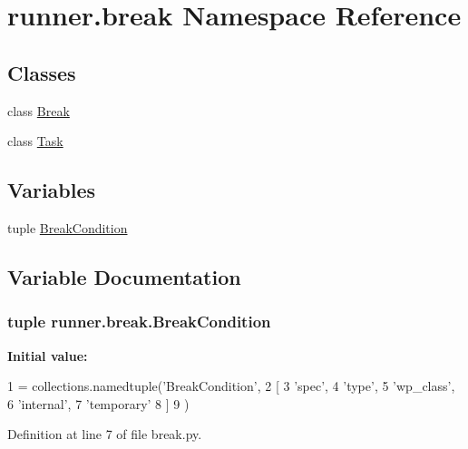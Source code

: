 \hypertarget{namespacerunner_1_1break}{}\section{runner.\+break Namespace Reference}
\label{namespacerunner_1_1break}
\subsection*{Classes}
\begin{DoxyCompactItemize}
\item 
class \hyperlink{classrunner_1_1break_1_1Break}{Break}
\item 
class \hyperlink{classrunner_1_1break_1_1Task}{Task}
\end{DoxyCompactItemize}
\subsection*{Variables}
\begin{DoxyCompactItemize}
\item 
tuple \hyperlink{namespacerunner_1_1break_a2f9322b4bd3cdac22fdee2c413bb776f}{Break\+Condition}
\end{DoxyCompactItemize}


\subsection{Variable Documentation}
\hypertarget{namespacerunner_1_1break_a2f9322b4bd3cdac22fdee2c413bb776f}{}
\subsubsection[{Break\+Condition}]{\setlength{\rightskip}{0pt plus 5cm}tuple runner.\+break.\+Break\+Condition}\label{namespacerunner_1_1break_a2f9322b4bd3cdac22fdee2c413bb776f}
{\bfseries Initial value\+:}
\begin{DoxyCode}
1 = collections.namedtuple(\textcolor{stringliteral}{'BreakCondition'},
2                                         [
3                                          \textcolor{stringliteral}{'spec'},
4                                          \textcolor{stringliteral}{'type'},
5                                          \textcolor{stringliteral}{'wp\_class'},
6                                          \textcolor{stringliteral}{'internal'},
7                                          \textcolor{stringliteral}{'temporary'}
8                                         ]
9                                        )
\end{DoxyCode}


Definition at line 7 of file break.\+py.


